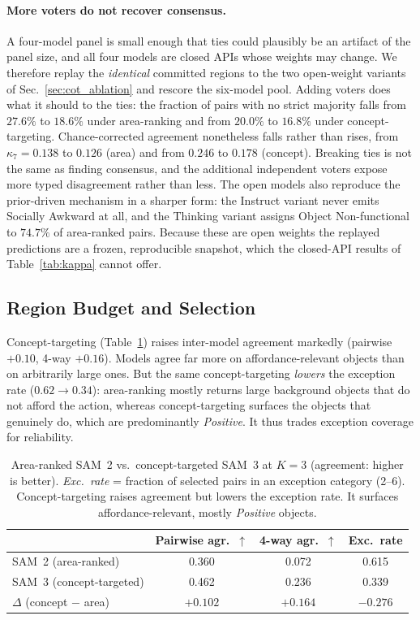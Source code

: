 \documentclass[runningheads]{llncs}
\begin{document}
\paragraph{More voters do not recover consensus.}
A four-model panel is small enough that ties could plausibly be an artifact of the panel size, and all four models are closed APIs whose weights may change.
We therefore replay the \emph{identical} committed regions to the two open-weight variants of Sec.~\ref{sec:cot_ablation} and rescore the six-model pool.
Adding voters does what it should to the ties: the fraction of pairs with no strict majority falls from $27.6\%$ to $18.6\%$ under area-ranking and from $20.0\%$ to $16.8\%$ under concept-targeting.
Chance-corrected agreement nonetheless falls rather than rises, from $\kappa_7=0.138$ to $0.126$ (area) and from $0.246$ to $0.178$ (concept).
Breaking ties is not the same as finding consensus, and the additional independent voters expose more typed disagreement rather than less.
The open models also reproduce the prior-driven mechanism in a sharper form: the Instruct variant never emits Socially Awkward at all, and the Thinking variant assigns Object Non-functional to $74.7\%$ of area-ranked pairs.
Because these are open weights the replayed predictions are a frozen, reproducible snapshot, which the closed-API results of Table~\ref{tab:kappa} cannot offer.

\subsection{Region Budget and Selection}
\label{sec:ablations}

Concept-targeting (Table~\ref{tab:selection}) raises inter-model agreement markedly (pairwise $+0.10$, 4-way $+0.16$). 
Models agree far more on affordance-relevant objects than on arbitrarily large ones. 
But the same concept-targeting \emph{lowers} the exception rate ($0.62\!\to\!0.34$): area-ranking mostly returns large background objects that do not afford the action, whereas concept-targeting surfaces the objects that genuinely do, which are predominantly \emph{Positive}.
It thus trades exception coverage for reliability.

\begin{table}[t]
  \centering
  \footnotesize
  \caption{Area-ranked SAM~2 vs.\ concept-targeted SAM~3 at $K=3$ (agreement: higher is better). \emph{Exc.\ rate} = fraction of selected pairs in an exception category (2--6). Concept-targeting raises agreement but lowers the exception rate. It surfaces affordance-relevant, mostly \emph{Positive} objects.}
  \label{tab:selection}
  \begin{tabular}{lccc}
    \toprule
    & Pairwise agr.\ $\uparrow$ & 4-way agr.\ $\uparrow$ & Exc.\ rate \\
    \midrule
    SAM~2 (area-ranked)     & 0.360 & 0.072 & 0.615 \\
    SAM~3 (concept-targeted) & 0.462 & 0.236 & 0.339 \\
    \midrule
    $\Delta$ (concept $-$ area) & $+0.102$ & $+0.164$ & $-0.276$ \\
    \bottomrule
  \end{tabular}
\end{table}
\end{document}

